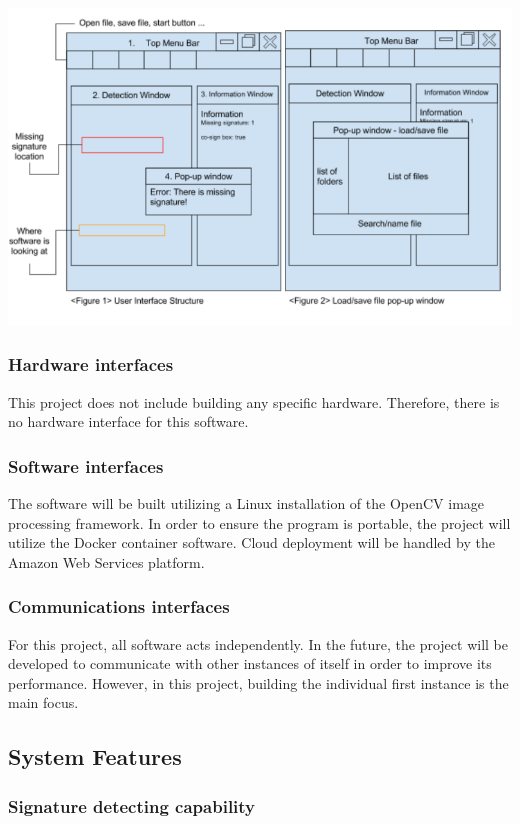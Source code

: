 \documentclass[onecolumn, draftclsnofoot,10pt, compsoc]{IEEEtran}
\begin{document}
\includegraphics[scale= 0.75]{UISnap.PNG}

\subsubsection{Hardware interfaces}
This project does not include building any specific hardware. Therefore, there is no hardware interface for this software.

\subsubsection{Software interfaces}
The software will be built utilizing a Linux installation of the OpenCV image processing framework. In order to ensure the program is portable, the project will utilize the Docker container software. Cloud deployment will be handled by the Amazon Web Services platform.

\subsubsection{Communications interfaces}
For this project, all software acts independently. In the future, the project will be developed to communicate with other instances of itself in order to improve its performance.  However, in this project, building the individual first instance is the main focus.


\subsection{System Features}
\subsubsection{Signature detecting capability}\vspace{.5cm}
\end{document}
